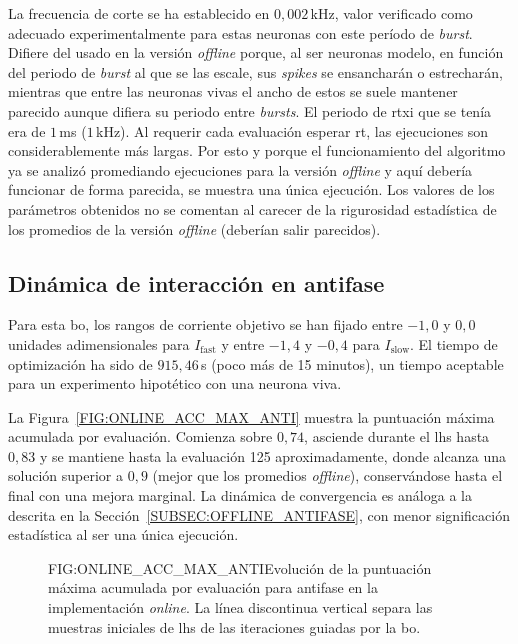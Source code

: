 La frecuencia de corte se ha establecido en $0{,}002$\,kHz, valor verificado como adecuado experimentalmente para estas neuronas con este período de \textit{burst}. Difiere del usado en la versión \textit{offline} porque, al ser neuronas modelo, en función del periodo de \textit{burst} al que se las escale, sus \textit{spikes} se ensancharán o estrecharán, mientras que entre las neuronas vivas el ancho de estos se suele mantener parecido aunque difiera su periodo entre \textit{bursts}. El periodo de \ac{rtxi} que se tenía era de $1$\,ms ($1$\,kHz). Al requerir cada evaluación esperar \ac{rt}, las ejecuciones son considerablemente más largas. Por esto y porque el funcionamiento del algoritmo ya se analizó promediando ejecuciones para la versión \textit{offline} y aquí debería funcionar de forma parecida, se muestra una única ejecución. Los valores de los parámetros obtenidos no se comentan al carecer de la rigurosidad estadística de los promedios de la versión \textit{offline} (deberían salir parecidos).


\subsection{Dinámica de interacción en antifase\label{SUBSEC:ONLINE_ANTIFASE}}

Para esta \ac{bo}, los rangos de corriente objetivo se han fijado entre $-1{,}0$ y $0{,}0$\,unidades adimensionales para $I_{\mathrm{fast}}$ y entre $-1{,}4$ y $-0{,}4$ para $I_{\mathrm{slow}}$. El tiempo de optimización ha sido de $915{,}46$\,s (poco más de 15 minutos), un tiempo aceptable para un experimento hipotético con una neurona viva.

La Figura~\ref{FIG:ONLINE_ACC_MAX_ANTI} muestra la puntuación máxima acumulada por evaluación. Comienza sobre $0{,}74$, asciende durante el \ac{lhs} hasta $0{,}83$ y se mantiene hasta la evaluación 125 aproximadamente, donde alcanza una solución superior a $0{,}9$ (mejor que los promedios \textit{offline}), conservándose hasta el final con una mejora marginal. La dinámica de convergencia es análoga a la descrita en la Sección~\ref{SUBSEC:OFFLINE_ANTIFASE}, con menor significación estadística al ser una única ejecución.

\begin{figure}[Puntuación máxima acumulada por evaluación de la \acl{bo} \textit{online} en antifase]{FIG:ONLINE_ACC_MAX_ANTI}{Evolución de la puntuación máxima acumulada por evaluación para antifase en la implementación \textit{online}. La línea discontinua vertical separa las muestras iniciales de \ac{lhs} de las iteraciones guiadas por la \ac{bo}.}
\end{figure}

